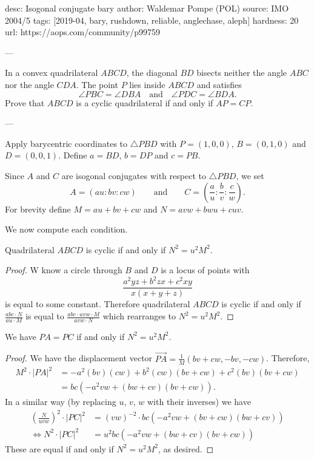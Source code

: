 desc: Isogonal conjugate bary
author: Waldemar Pompe (POL)
source: IMO 2004/5
tags: [2019-04, bary, rushdown, reliable, anglechase, aleph]
hardness: 20
url: https://aops.com/community/p99759

---

In a convex quadrilateral $ABCD$,
the diagonal $BD$ bisects neither the angle $ABC$ nor the angle $CDA$.
The point $P$ lies inside $ABCD$ and satisfies
\[\angle PBC=\angle DBA \quad\text{and}\quad \angle PDC=\angle BDA. \]
Prove that $ABCD$ is a cyclic quadrilateral
if and only if $AP=CP$.

---

Apply barycentric coordinates to $\triangle PBD$
with $P = (1,0,0)$, $B = (0,1,0)$ and $D = (0,0,1)$.
Define $a = BD$, $b = DP$ and $c = PB$.

Since $A$ and $C$ are isogonal conjugates with respect to $\triangle PBD$,
we set \[ A = (au : bv : cw) \qquad\text{and}\qquad
  C = \left( \frac au : \frac bv : \frac cw \right). \]
For brevity define $M = au + bv + cw$ and $N = avw + bwu + cuv$.

We now compute each condition.
\begin{claim*}
  Quadrilateral $ABCD$ is cyclic if and only if $N^2 = u^2 M^2$.
\end{claim*}
\begin{proof}
  W know a circle through $B$ and $D$
  is a locus of points
  with \[ \frac{a^2yz+b^2zx+c^2xy}{x(x+y+z)} \]
  is equal to some constant.
  Therefore quadrilateral $ABCD$ is cyclic if and only if
  $\frac{abc \cdot N}{au \cdot M}$
  is equal to $\frac{abc \cdot uvw \cdot M}{avw \cdot N}$
  which rearranges to $N^2 = u^2M^2$.
\end{proof}
\begin{claim*}
  We have $PA = PC$ if and only if $N^2 = u^2 M^2$.
\end{claim*}
\begin{proof}
  We have the displacement vector
  $\overrightarrow{PA}
  = \tfrac{1}{M} \left( bv+cw , -bv ,-cw \right)$.
  Therefore,
  \begin{align*}
    M^2 \cdot \left\lvert PA \right\rvert^2
    &= -a^2(bv)(cw) + b^2(cw)(bv+cw) + c^2(bv)(bv+cw) \\
    &= bc(-a^2vw + (bw+cv)(bv+cw)).
  \end{align*}
  In a similar way
  (by replacing $u$, $v$, $w$ with their inverses)
  we have
  \begin{align*}
    \left( \frac{N}{uvw} \right)^2 \cdot \left\lvert PC \right\rvert^2
    &= (vw)^{-2} \cdot bc(-a^2vw + (bv+cw)(bw+cv)) \\
    \iff N^2 \cdot \left\lvert PC \right\rvert^2
    & = u^2 bc(-a^2vw + (bw+cv)(bv+cw))
  \end{align*}
  These are equal if and only if $N^2 = u^2M^2$, as desired.
\end{proof}
